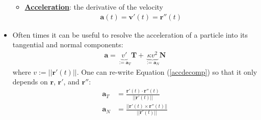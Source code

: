 \documentclass[reqno,11pt]{amsart}
\theoremstyle{definition}
\theoremstyle{remark}
\newcommand{\dfn}[1]{\underline{\textbf{#1}}}
\begin{document}
\begin{itemize}[noitemsep]
\begin{itemize}
		\item \dfn{Acceleration}: the derivative of the velocity
		\begin{align}
			\mathbf{a}(t) = \mathbf{v'}(t) = \mathbf{r}''(t) 	
		\end{align}
	\end{itemize}
	\item Often times it can be useful to resolve the acceleration of a particle into its tangential and normal components: 
	\begin{align}\label{accdecomp}
		\mathbf{a} = \underbrace{v'}_{:= \mathbf{a}_T}  \mathbf{T} + \underbrace{ \kappa v^2}_{:= \mathbf{a}_N}	\mathbf{N}
	\end{align}
	where $v := || \mathbf{r}'(t) ||$. One can re-write Equation (\ref{accdecomp}) so that it only depends on $\mathbf{r}$, $\mathbf{r}'$, and $\mathbf{r}''$: 
	\begin{align}
		\mathbf{a}_T & = \frac{\mathbf{r}'(t) \cdot \mathbf{r}''(t)}{|| \mathbf{r}'(t) ||}	\\
		\mathbf{a}_N & = \frac{|| \mathbf{r}'(t) \times \mathbf{r}''(t) || }{|| \mathbf{r}'(t) ||}
	\end{align}
\end{itemize}
\end{document}
